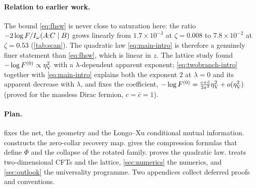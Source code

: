 \paragraph{Relation to earlier work.}
The bound \eqref{eq:fhsw} is never close to saturation here: the ratio
$-2\log F/I_\omega(A{:}C\mid B)$ grows linearly from $1.7\times10^{-3}$ at
$\zeta=0.008$ to $7.8\times10^{-2}$ at $\zeta=0.53$ (\cref{tab:scan}).  The
quadratic law \eqref{eq:main-intro} is therefore a genuinely finer statement than
\eqref{eq:fhsw}, which is linear in $z$.  The lattice study \cite{VWZ} found
$-\log F^{(0)}\propto\eta_{\rm V}^{2}$ with a $\lambda$-dependent apparent
exponent; \eqref{eq:twobranch-intro} together with \eqref{eq:main-intro} explains
both the exponent $2$ at $\lambda=0$ and its apparent decrease with $\lambda$, and
fixes the coefficient, $-\log F^{(0)}=\frac{c+\bar c}{3\pi^2}\eta_{\rm V}^2
+o(\eta_{\rm V}^2)$ (proved for the massless Dirac fermion, $c=\bar c=1$).

\paragraph{Plan.}
 fixes the net, the geometry and the Longo--Xu conditional
mutual information.   constructs the zero-collar recovery map.
 gives the compression formulas that define $\Phi$ and the
collapse of the rotated family.   proves the quadratic law.
 treats two-dimensional CFTs and the lattice, \cref{sec:numerics}
the numerics, and \cref{sec:outlook} the universality programme.  Two appendices
collect deferred proofs and conventions.
